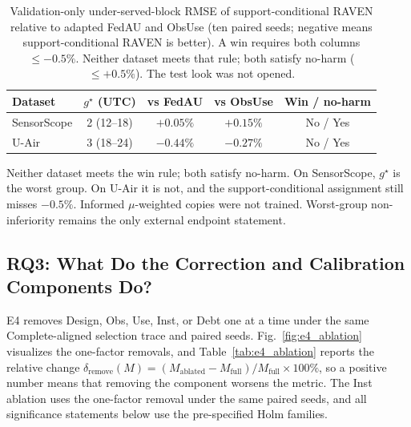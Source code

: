 \documentclass[letterpaper,journal]{IEEEtran}
\begin{document}
\begin{table}[t]
\centering
\caption{Validation-only under-served-block RMSE of support-conditional RAVEN relative
to adapted FedAU and ObsUse (ten paired seeds; negative means
support-conditional RAVEN is better).  A win requires both columns $\le-0.5\%$.  Neither
dataset meets that rule; both satisfy no-harm ($\le+0.5\%$).  The test
look was not opened.}
\label{tab:underserved_block}
\setlength{\tabcolsep}{3.5pt}
\begin{tabular}{lcccc}
\toprule
Dataset & $g^{\star}$ (UTC) & vs FedAU & vs ObsUse & Win / no-harm\\
\midrule
SensorScope & 2 (12--18) & $+0.05\%$ & $+0.15\%$ & No / Yes\\
U-Air & 3 (18--24) & $-0.44\%$ & $-0.27\%$ & No / Yes\\
\bottomrule
\end{tabular}
\end{table}

Neither dataset meets the win rule; both satisfy no-harm.
On SensorScope, $g^{\star}$ is the worst group.  On U-Air it is not, and
the support-conditional assignment still misses $-0.5\%$.  Informed $\mu$-weighted copies
were not trained.  Worst-group non-inferiority remains the only external
endpoint statement.

\subsection{RQ3: What Do the Correction and Calibration Components Do?}
\label{subsec:eval_rq3}

E4 removes Design, Obs, Use, Inst, or Debt one at a time under the same
Complete-aligned selection trace and paired seeds.  Fig.~\ref{fig:e4_ablation}
visualizes the one-factor removals, and Table~\ref{tab:e4_ablation}
reports the relative change
$\delta_{\mathrm{remove}}(M)
=(M_{\mathrm{ablated}}-M_{\mathrm{full}})/M_{\mathrm{full}}\times100\%$,
so a positive number means that removing the component worsens the metric.
The Inst ablation uses the one-factor removal under the same paired seeds, and
all significance statements below use the pre-specified Holm families.
\end{document}
